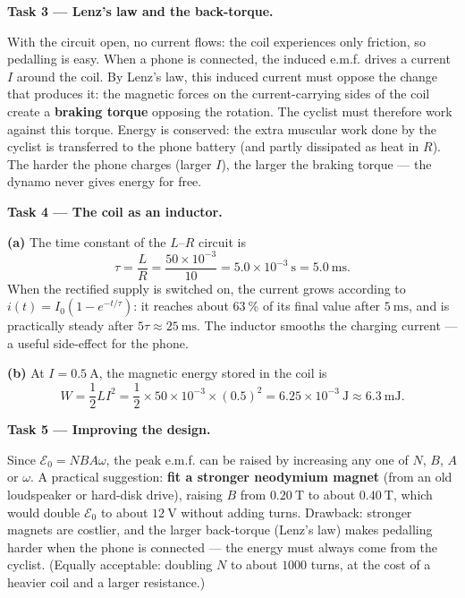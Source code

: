 \documentclass[11pt]{article}
\newcommand{\cle}[1]{{\popxbold\color{popdark}#1}}
\begin{document}
\textbf{Task 3 — Lenz's law and the back-torque.}\par
With the circuit open, no current flows: the coil experiences only friction, so pedalling is easy. When a phone is connected, the induced e.m.f. drives a current $I$ around the coil. By \cle{Lenz's law}, this induced current must oppose the change that produces it: the magnetic forces on the current-carrying sides of the coil create a \textbf{braking torque} opposing the rotation. The cyclist must therefore work against this torque. Energy is conserved: the extra muscular work done by the cyclist is transferred to the phone battery (and partly dissipated as heat in $R$). The harder the phone charges (larger $I$), the larger the braking torque — the dynamo never gives energy for free.

\textbf{Task 4 — The coil as an inductor.}\par
\textbf{(a)} The time constant of the $L$--$R$ circuit is
\[
\tau = \frac{L}{R} = \frac{50\times 10^{-3}}{10} = 5.0\times 10^{-3}\ \mathrm{s} = 5.0\ \mathrm{ms}.
\]
When the rectified supply is switched on, the current grows according to $i(t) = I_0\left(1 - e^{-t/\tau}\right)$: it reaches about $63\ \%$ of its final value after $5\ \mathrm{ms}$, and is practically steady after $5\tau \approx 25\ \mathrm{ms}$. The inductor smooths the charging current — a useful side-effect for the phone.

\textbf{(b)} At $I = 0.5\ \mathrm{A}$, the magnetic energy stored in the coil is
\[
W = \frac{1}{2}LI^2 = \frac{1}{2}\times 50\times 10^{-3}\times (0.5)^2 = 6.25\times 10^{-3}\ \mathrm{J} \approx 6.3\ \mathrm{mJ}.
\]

\textbf{Task 5 — Improving the design.}\par
Since $\mathcal{E}_0 = NBA\omega$, the peak e.m.f. can be raised by increasing any one of $N$, $B$, $A$ or $\omega$. A practical suggestion: \textbf{fit a stronger neodymium magnet} (from an old loudspeaker or hard-disk drive), raising $B$ from $0.20\ \mathrm{T}$ to about $0.40\ \mathrm{T}$, which would double $\mathcal{E}_0$ to about $12\ \mathrm{V}$ without adding turns. Drawback: stronger magnets are costlier, and the larger back-torque (Lenz's law) makes pedalling harder when the phone is connected — the energy must always come from the cyclist. (Equally acceptable: doubling $N$ to about $1000$ turns, at the cost of a heavier coil and a larger resistance.)
\end{document}
